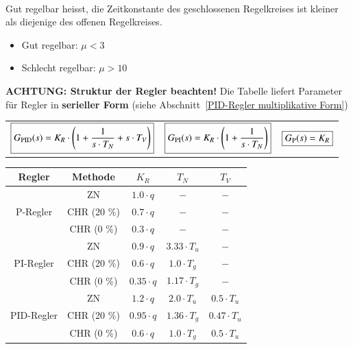 \textbf{} \\
Gut regelbar heisst, die Zeitkonstante des geschlossenen Regelkreises ist kleiner als diejenige des offenen Regelkreises.

\begin{itemize}
    \item Gut regelbar: $\mu < 3$
    \item Schlecht regelbar: $\mu > 10$
\end{itemize}

\vspace{0.1cm}

\textbf{ACHTUNG: Struktur der Regler beachten!} Die Tabelle liefert Parameter für Regler in \textbf{serieller Form}
(siehe Abschnitt~\ref{PID-Regler multiplikative Form}) 

\begin{tabular}{c c c }
    $ \boxed{ G_{\rm PID}(s) = K_R \cdot \Bigg( 1 + \frac{1}{s \cdot T_N} + s \cdot T_V \Bigg) }$ & 
    $ \boxed{ G_{\rm PI}(s) = K_R \cdot \Bigg( 1 + \frac{1}{s \cdot T_N} \Bigg) }$ &
    $ \boxed{ G_{\rm P}(s) = K_R }$ 
\end{tabular}

\begin{center}
    \begin{tabular}{c c c c c}
        \toprule
        Regler      & Methode       & $K_R$             & $T_N$                 & $T_V$             \\
        \toprule
                    & ZN            & $1.0 \cdot q$     & $-$                   & $-$               \\
        P-Regler    & CHR (20 \%)   & $0.7 \cdot q$     & $-$                   & $-$               \\
                    & CHR (0 \%)    & $0.3 \cdot q$     & $-$                   & $-$               \\
        \midrule
                    & ZN            & $0.9 \cdot q$     & $3.33 \cdot T_u$      & $-$               \\
        PI-Regler   & CHR (20 \%)   & $0.6 \cdot q$     & $1.0 \cdot T_g$       & $-$               \\
                    & CHR (0 \%)    & $0.35 \cdot q$    & $1.17 \cdot T_g$      & $-$               \\
        \midrule
                    & ZN            & $1.2 \cdot q$     & $2.0 \cdot T_u$       & $0.5 \cdot T_u$   \\
        PID-Regler  & CHR (20 \%)   & $0.95 \cdot q$    & $1.36 \cdot T_g$      & $0.47 \cdot T_u$  \\
                    & CHR (0 \%)    & $0.6 \cdot q$     & $1.0 \cdot T_g$       & $0.5 \cdot T_u$   \\
        \bottomrule
    \end{tabular}
\end{center}

